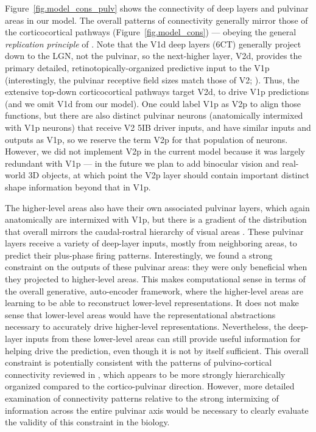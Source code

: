 \documentclass[11pt,twoside]{article}
\newif\myifpdf
\begin{document}
Figure~\ref{fig.model_cons_pulv} shows the connectivity of deep layers and pulvinar areas in our model.  The overall patterns of connectivity generally mirror those of the corticocortical pathways (Figure~\ref{fig.model_cons}) --- obeying the general {\em replication principle} of .  Note that the V1d deep layers (6CT) generally project down to the LGN, not the pulvinar, so the next-higher layer, V2d, provides the primary detailed, retinotopically-organized predictive input to the V1p (interestingly, the pulvinar receptive field sizes match those of V2; ).  Thus, the extensive top-down corticocortical pathways target V2d, to drive V1p predictions (and we omit V1d from our model).  One could label V1p as V2p to align those functions, but there are also distinct pulvinar neurons (anatomically intermixed with V1p neurons) that receive V2 5IB driver inputs, and have similar inputs and outputs as V1p, so we reserve the term V2p for that population of neurons.  However, we did not implement V2p in the current model because it was largely redundant with V1p --- in the future we plan to add binocular vision and real-world 3D objects, at which point the V2p layer should contain important distinct shape information beyond that in V1p.

The higher-level areas also have their own associated pulvinar layers, which again anatomically are intermixed with V1p, but there is a gradient of the distribution that overall mirrors the caudal-rostral hierarchy of visual areas \cite{Shipp03}.  These pulvinar layers receive a variety of deep-layer inputs, mostly from neighboring areas, to predict their plus-phase firing patterns.  Interestingly, we found a strong constraint on the outputs of these pulvinar areas: they were only beneficial when they projected to higher-level areas.  This makes computational sense in terms of the overall generative, auto-encoder framework, where the higher-level areas are learning to be able to reconstruct lower-level representations.  It does not make sense that lower-level areas would have the representational abstractions necessary to accurately drive higher-level representations.  Nevertheless, the deep-layer inputs from these lower-level areas can still provide useful information for helping drive the prediction, even though it is not by itself sufficient.  This overall constraint is potentially consistent with the patterns of pulvino-cortical connectivity reviewed in , which appears to be more strongly hierarchically organized compared to the cortico-pulvinar direction.  However, more detailed examination of connectivity patterns relative to the strong intermixing of information across the entire pulvinar axis would be necessary to clearly evaluate the validity of this constraint in the biology.
\end{document}
